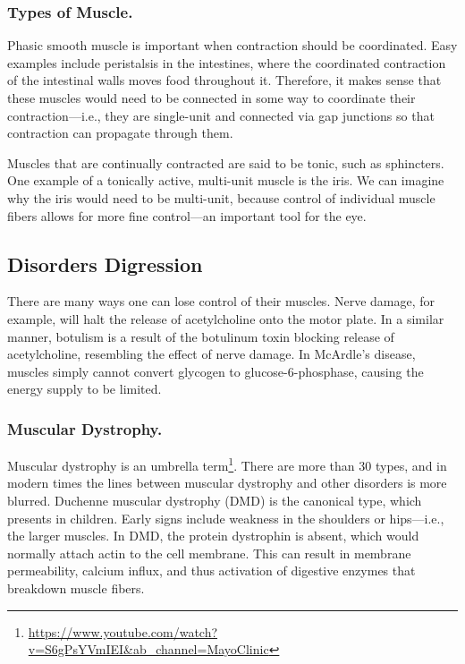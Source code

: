 \subsubsection{Types of Muscle.}

Phasic smooth muscle is important when contraction should be coordinated. Easy examples include peristalsis in the intestines, where the coordinated contraction of the intestinal walls moves food throughout it. Therefore, it makes sense that these muscles would need to be connected in some way to coordinate their contraction---i.e., they are single-unit and connected via gap junctions so that contraction can propagate through them.\newline

Muscles that are continually contracted are said to be tonic, such as sphincters. One example of a tonically active, multi-unit muscle is the iris. We can imagine why the iris would need to be multi-unit, because control of individual muscle fibers allows for more fine control---an important tool for the eye. 

\subsection{Disorders Digression}
There are many ways one can lose control of their muscles. Nerve damage, for example, will halt the release of acetylcholine onto the motor plate. In a similar manner, botulism is a result of the botulinum toxin blocking release of acetylcholine, resembling the effect of nerve damage. In McArdle's disease, muscles simply cannot convert glycogen to glucose-6-phosphase, causing the energy supply to be limited. 

\subsubsection{Muscular Dystrophy.}

Muscular dystrophy is an umbrella term\footnote{\url{https://www.youtube.com/watch?v=S6gPsYVmIEI\&ab_channel=MayoClinic}}. There are more than 30 types, and in modern times the lines between muscular dystrophy and other disorders is more blurred. Duchenne muscular dystrophy (DMD) is the canonical type, which presents in children. Early signs include weakness in the shoulders or hips---i.e., the larger muscles. In DMD, the protein dystrophin is absent, which would normally attach actin to the cell membrane. This can result in membrane permeability, calcium influx, and thus activation of digestive enzymes that breakdown muscle fibers.\newline

